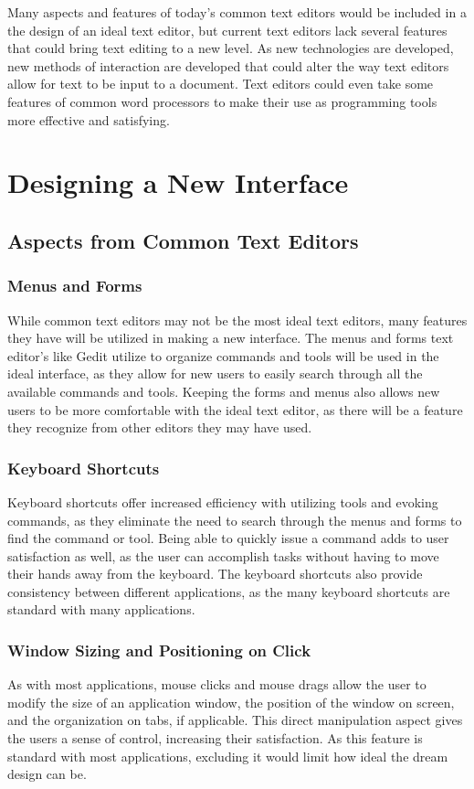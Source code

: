 \documentclass[11pt, oneside]{article}
\begin{document}
Many aspects and features of today's common text editors would be included in a the design of an ideal text editor, but current text editors lack several features that could bring text editing to a new level. As new technologies are developed, new methods of interaction are developed that could alter the way text editors allow for text to be input to a document. Text editors could even take some features of common word processors to make their use as programming tools more effective and satisfying. 

\section{Designing a New Interface}
\subsection{Aspects from Common Text Editors}
\subsubsection{Menus and Forms}
While common text editors may not be the most ideal text editors, many features they have will be utilized in making a new interface. The menus and forms text editor's like Gedit utilize to organize commands and tools will be used in the ideal interface, as they allow for new users to easily search through all the available commands and tools. Keeping the forms and menus also allows new users to be more comfortable with the ideal text editor, as there will be a feature they recognize from other editors they may have used. 

\subsubsection{Keyboard Shortcuts}
Keyboard shortcuts offer increased efficiency with utilizing tools and evoking commands, as they eliminate the need to search through the menus and forms to find the command or tool. Being able to quickly issue a command adds to user satisfaction as well, as the user can accomplish tasks without having to move their hands away from the keyboard. The keyboard shortcuts also provide consistency between different applications, as the many keyboard shortcuts are standard with many applications.

\subsubsection{Window Sizing and Positioning on Click}
As with most applications, mouse clicks and mouse drags allow the user to modify the size of an application window, the position of the window on screen, and the organization on tabs, if applicable. This direct manipulation aspect gives the users a sense of control, increasing their satisfaction. As this feature is standard with most applications, excluding it would limit how ideal the dream design can be.
\end{document}
